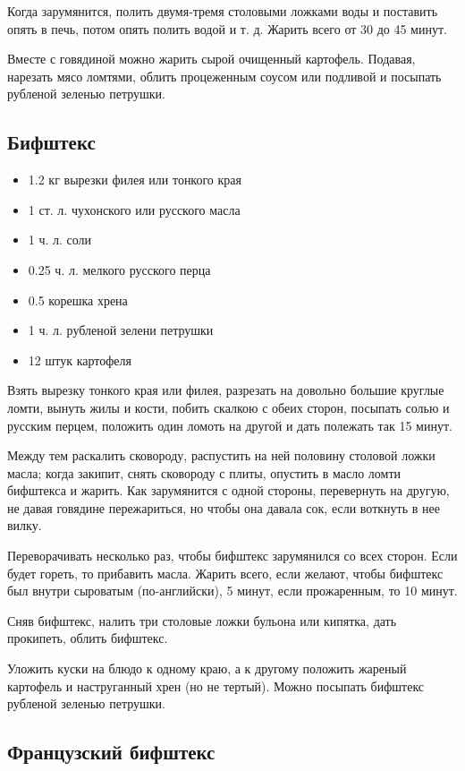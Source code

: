 Когда зарумянится, полить двумя-тремя столовыми ложками воды и поставить опять в печь, потом опять полить водой и т. д. Жарить всего от 30 до 45 минут.

Вместе с говядиной можно жарить сырой очищенный картофель. Подавая, нарезать мясо ломтями, облить процеженным соусом или подливой и посыпать рубленой зеленью петрушки.

\subsection{Бифштекс}\label{3bifshteks}

\begin{itemize}
	\item 1.2 кг вырезки филея или тонкого края 
    \item 1 ст. л. чухонского или русского масла
    \item 1 ч. л. соли 
    \item 0.25 ч. л. мелкого русского перца 
    \item 0.5 корешка хрена 
    \item 1 ч. л. рубленой зелени петрушки 
    \item 12 штук картофеля
\end{itemize}

Взять вырезку тонкого края или филея, разрезать на довольно большие круглые ломти, вынуть жилы и кости, побить скалкою с обеих сторон, посыпать солью и русским перцем, положить один ломоть на другой и дать полежать так 15 минут.

Между тем раскалить сковороду, распустить на ней половину столовой ложки масла; когда закипит, снять сковороду с плиты, опустить в масло ломти бифштекса и жарить. Как зарумянится с одной стороны, перевернуть на другую, не давая говядине пережариться, но чтобы она давала сок, если воткнуть в нее вилку.

Переворачивать несколько раз, чтобы бифштекс зарумянился со всех сторон. Если будет гореть, то прибавить масла. Жарить всего, если желают, чтобы бифштекс был внутри сыроватым (по-английски), 5 минут, если прожаренным, то 10 минут.

Сняв бифштекс, налить три столовые ложки бульона или кипятка, дать прокипеть, облить бифштекс.

Уложить куски на блюдо к одному краю, а к другому положить жареный картофель и наструганный хрен (но не тертый). Можно посыпать бифштекс рубленой зеленью петрушки.

\subsection{Французский бифштекс}\label{4franc-bifshteks}

